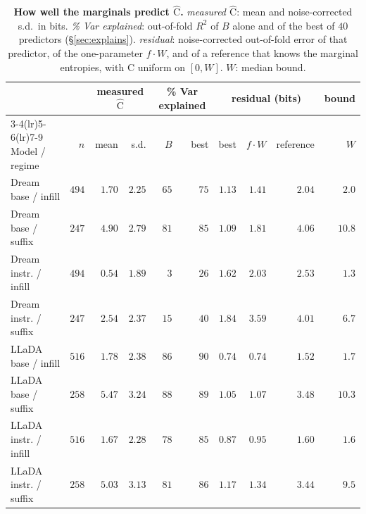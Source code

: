 \begin{table}[t]
\centering
\small
\setlength{\tabcolsep}{4pt}
\begin{tabular}{lrrrrrrrrr}
\toprule
 & & \multicolumn{2}{c}{measured $\widehat{\mathrm{C}}$} & \multicolumn{2}{c}{\% Var explained} & \multicolumn{3}{c}{residual (bits)} & bound \\
\cmidrule(lr){3-4}\cmidrule(lr){5-6}\cmidrule(lr){7-9}
Model / regime & $n$ & mean & s.d. & $B$ & best & best & $f\cdot W$ & reference & $W$ \\
\midrule
Dream base / infill & $494$ & $1.70$ & $2.25$ & $65$ & $75$ & $1.13$ & $1.41$ & $2.04$ & $2.0$ \\
Dream base / suffix & $247$ & $4.90$ & $2.79$ & $81$ & $85$ & $1.09$ & $1.81$ & $4.06$ & $10.8$ \\
Dream instr. / infill & $494$ & $0.54$ & $1.89$ & $3$ & $26$ & $1.62$ & $2.03$ & $2.53$ & $1.3$ \\
Dream instr. / suffix & $247$ & $2.54$ & $2.37$ & $15$ & $40$ & $1.84$ & $3.59$ & $4.01$ & $6.7$ \\
LLaDA base / infill & $516$ & $1.78$ & $2.38$ & $86$ & $90$ & $0.74$ & $0.74$ & $1.52$ & $1.7$ \\
LLaDA base / suffix & $258$ & $5.47$ & $3.24$ & $88$ & $89$ & $1.05$ & $1.07$ & $3.48$ & $10.3$ \\
LLaDA instr. / infill & $516$ & $1.67$ & $2.28$ & $78$ & $85$ & $0.87$ & $0.95$ & $1.60$ & $1.6$ \\
LLaDA instr. / suffix & $258$ & $5.03$ & $3.13$ & $81$ & $86$ & $1.17$ & $1.34$ & $3.44$ & $9.5$ \\
\bottomrule
\end{tabular}
\caption{\textbf{How well the marginals predict $\widehat{\mathrm{C}}$.}
\emph{measured $\widehat{\mathrm{C}}$}: mean and noise-corrected s.d.\ in bits.
\emph{\% Var explained}: out-of-fold $R^2$ of $B$ alone and of the best of $40$
predictors (\S\ref{sec:explains}). \emph{residual}: noise-corrected out-of-fold error of
that predictor, of the one-parameter $f\cdot W$, and of a reference that knows the
marginal entropies, with $\mathrm{C}$ uniform on $[0,W]$.
$W$: median bound.}
\label{tab:explains}
\end{table}
